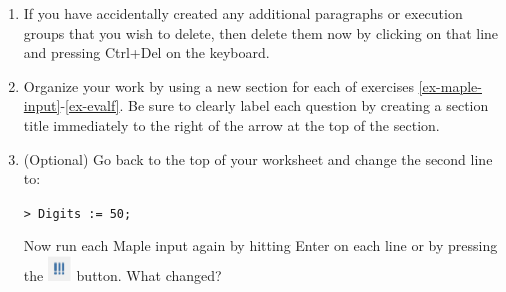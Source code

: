 \begin{enumerate}
    
    \item If you have accidentally created any additional paragraphs or execution groups that you wish to delete, then delete them now by clicking on that line and pressing Ctrl+Del on the keyboard.
    	
    \item Organize your work by using a new section for each of exercises \ref{ex-maple-input}-\ref{ex-evalf}. Be sure to clearly label each question by creating a section title immediately to the right of the arrow at the top of the section.
    \item (Optional) Go back to the top of your worksheet and change the second line to:
    \par \texttt{> Digits := 50;}
    \par Now run each Maple input again by hitting Enter on each line or by pressing the \includegraphics[width=0.05\textwidth]{activities/math112/figures/execute_button.eps} button. What changed?
    
\end{enumerate}